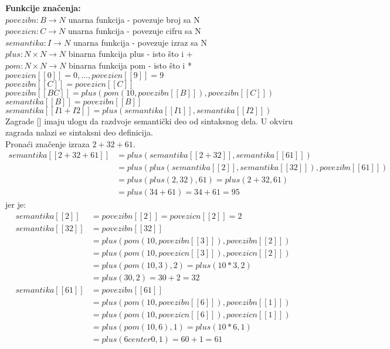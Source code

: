\documentclass[../main.tex]{subfiles}
\begin{document}
	\begin{boxprimer}[breakable]
	{\bf Funkcije značenja:}\\
	$povezibn : B \rightarrow N$ \tab unarna funkcija - povezuje broj sa N\\
$povezicn : C \rightarrow N$ \tab unarna funkcija - povezuje cifru sa N\\
$semantika : I \rightarrow N$ \tab unarna funkcija - povezuje izraz sa N\\
$plus : N \times N \rightarrow N$ \tab binarna funkcija plus - isto što i +\\
$pom : N \times N \rightarrow N$ \tab binarna funkcija pom - isto što i *\\
$povezicn[\![0]\!] = 0, ..., povezicn[\![9]\!] = 9$ \\
$povezibn[\![C]\!] = povezicn[\![C]\!]$\\
$povezibn[\![BC]\!] = plus(pom(10, povezibn[\![B]\!]), povezibn[\![C]\!])$\\
$semantika[\![B]\!] = povezibn[\![B]\!]$\\
$semantika[\![I1 + I2]\!] = plus(semantika[\![I1]\!], semantika[\![I2]\!])$\\
	
	Zagrade [\![, ]\!] imaju ulogu da razdvoje semantički deo od sintaksnog dela. U okviru zagrada
nalazi se sintaksni deo definicija.
	\\
	Pronaći značenje izraza $2+32+61$.
	\begin{align*}
	semantika[\![2+32+61]\!] &= plus(semantika[\![2+32]\!],semantika[\![61]\!])\\
					&= plus(plus(semantika[\![2]\!],semantika[\![32]\!]),povezibn[\![61]\!]) \\
					&= plus(plus(2,32),61) = plus(2+32,61)\\
					&= plus(34+61) = 34+61 = 95
	\end{align*}
	jer je:
	\begin{align*}
	semantika[\![2]\!] &= povezibn[\![2]\!] = povezicn[\![2]\!] = 2\\
	semantika[\![32]\!] &= povezibn[\![32]\!] \\
				&= plus(pom(10,povezibn[\![3]\!]),povezibn[\![2]\!])\\
				&=plus(pom(10,povezicn[\![3]\!]),povezicn[\![2]\!])\\
				&= plus(pom(10,3),2) = plus(10*3,2) \\
				&= plus(30,2) = 30+2 = 32 \\
	semantika[[61]] &= povezibn[\![61]\!] \\
				&= plus(pom(10,povezibn[\![6]\!]),povezibn[\![1]\!]) \\
				&= plus(pom(10,povezicn[\![6]\!]),povezicn[\![1]\!])\\
				&= plus(pom(10,6),1) = plus(10*6,1) \\
				&= plus(6center0,1) = 60+1 = 61
	\end{align*}
	\end{boxprimer}
	
\end{document}
